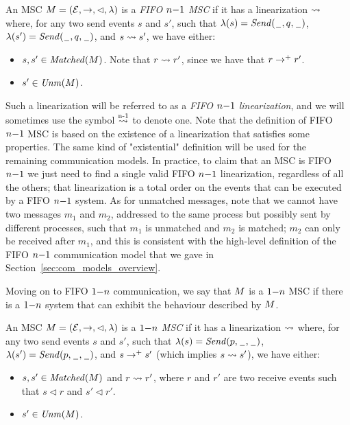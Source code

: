 \begin{definition}\label{def:mb_msc}
An MSC $M = (\mathcal{E},\to,\lhd,\lambda)$ is a \emph{FIFO $n\mathsf{-}1$ MSC} if it has a linearization $\rightsquigarrow$ where, for any two send events $s$ and $s'$, such that $\lambda(s)={\mathit{Send}(\hspace{0.1em}\underline{\hspace{0.5em}}\hspace{0.1em},q,\hspace{0.1em}\underline{\hspace{0.5em}}\hspace{0.1em})}$, $\lambda(s')={\mathit{Send}(\hspace{0.1em}\underline{\hspace{0.5em}}\hspace{0.1em},q,\hspace{0.1em}\underline{\hspace{0.5em}}\hspace{0.1em})}$, and $s \rightsquigarrow s'$, we have either:
\begin{itemize}\itemsep=0.5ex
	\item $s,s' \in \mathit{Matched}(M)$. Note that $r \rightsquigarrow r'$, since we have that $r \to^+ r'$.
	\item $s' \in \mathit{Unm}(M)$.
\end{itemize}
\end{definition}


Such a linearization will be referred to as a \emph{FIFO $n\mathsf{-}1$ linearization}, and we will sometimes use the symbol $\overset{\text{n-1}}{\rightsquigarrow}$ to denote one. Note that the definition of FIFO $n\mathsf{-}1$ MSC is based on the existence of a linearization that satisfies some properties. The same kind of "existential" definition will be used for the remaining communication models. In practice, to claim that an MSC is FIFO $n\mathsf{-}1$ we just need to find a single valid FIFO $n\mathsf{-}1$ linearization, regardless of all the others; that linearization is a total order on the events that can be executed by a FIFO $n\mathsf{-}1$ system. As for unmatched messages, note that we cannot have two messages $m_1$ and $m_2$, addressed to the same process but possibly sent by different processes, such that $m_1$ is unmatched and $m_2$ is matched; $m_2$ can only be received after $m_1$, and this is consistent with the high-level definition of the FIFO $n\mathsf{-}1$ communication model that we gave in Section~\ref{sec:com_models_overview}.


Moving on to FIFO $1\mathsf{-}n$ communication, we say that $M$ is a $1\mathsf{-}n$ MSC if there is a $1\mathsf{-}n$ system that can exhibit the behaviour described by $M$. 

\begin{definition}\label{def:one_n}
An MSC $M = (\mathcal{E},\to,\lhd,\lambda)$ is a \emph{$1\mathsf{-}n$ MSC} if it has a linearization $\rightsquigarrow$ where, for any two send events $s$ and $s'$, such that $\lambda(s)={\mathit{Send}(p,\hspace{0.1em}\underline{\hspace{0.5em}}\hspace{0.1em},\hspace{0.1em}\underline{\hspace{0.5em}}\hspace{0.1em})}$, $\lambda(s')={\mathit{Send}(p,\hspace{0.1em}\underline{\hspace{0.5em}}\hspace{0.1em},\hspace{0.1em}\underline{\hspace{0.5em}}\hspace{0.1em})}$, and $s \to^+ s'$ (which implies $s \rightsquigarrow s'$), we have either:
\begin{itemize}\itemsep=0.5ex
	\item $s,s' \in \mathit{Matched}(M)$ and $r \rightsquigarrow r'$, where $r$ and $r'$ are two receive events such that $s \lhd r$ and $s' \lhd r'$.
	\item $s' \in \mathit{Unm}(M)$.
\end{itemize}
\end{definition}

